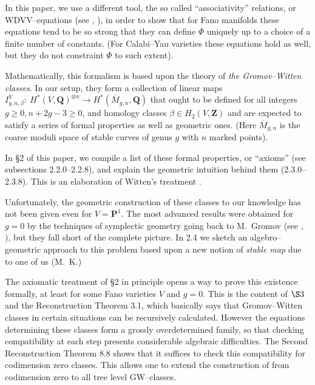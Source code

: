 \documentclass[reqno]{amsart}
\theoremstyle{definition}
\begin{document}
\smallskip

In this paper, we use a different tool, the so called ``associativity''
relations, or WDVV--equations (see \cite{W}, \cite{D}),
in order to show that for Fano
manifolds these equations tend to be so strong that they can define
$\Phi$ uniquely up to a choice of a finite number of constants.
(For Calabi--Yau varieties these equations hold as well, but they
do not constraint $\Phi$ to such extent).

\smallskip

Mathematically, this formalism is based upon the theory of
{\it the Gromov--Witten classes}. In our setup, they form a collection
of linear maps $I^V_{g,n,\beta}:\ H^*(V,\mathbf{Q})^{\otimes n}\to
H^*(\overline{M}_{g,n},\mathbf{Q})$ that ought to be defined for all
integers $g\ge 0, n+2g-3\ge 0$, and homology classes
$\beta \in H_2(V,\mathbf{Z})$ and are expected to satisfy a series
of formal properties as well as geometric ones.
(Here $\overline{M}_{g,n}$ is the coarse moduli space
of stable curves of genus $g$ with $n$ marked points).

\smallskip

In \S 2 of this paper, we compile a list of these formal properties,
or ``axioms'' (see subsections 2.2.0--2.2.8), and explain
the geometric intuition behind them (2.3.0--2.3.8). This is an
elaboration of Witten's treatment \cite{W}.

\smallskip

Unfortunately, the geometric construction of these classes to our knowledge
has not been given even for $V=\mathbf{P}^1$. The most advanced
results were obtained for $g=0$ by the techniques of symplectic
geometry going back to M.~Gromov (see \cite{R}, \cite{RT}), but they fall
short of the complete picture. In 2.4 we sketch an algebro--geometric
approach to this problem based upon a new notion of {\it stable map}
due to one of us (M.~K.)

\smallskip

The axiomatic treatment of \S 2 in principle opens a way to prove
this existence formally, at least for some Fano varieties $V$
and $g=0$. This is the content of $\S 3$ and the Reconstruction
Theorem 3.1, which basically says that Gromov--Witten classes
in certain situations can be recursively calculated. However
the equations determining these classes form a grossly overdetermined
family, so that checking compatibility at each step presents
considerable algebraic difficulties. The Second Reconstruction Theorem
8.8 shows that it suffices to check this compatibility
for codimension zero classes. This allows one to extend the construction
of \cite{RT} from codimension zero to all tree level GW--classes.
\end{document}
